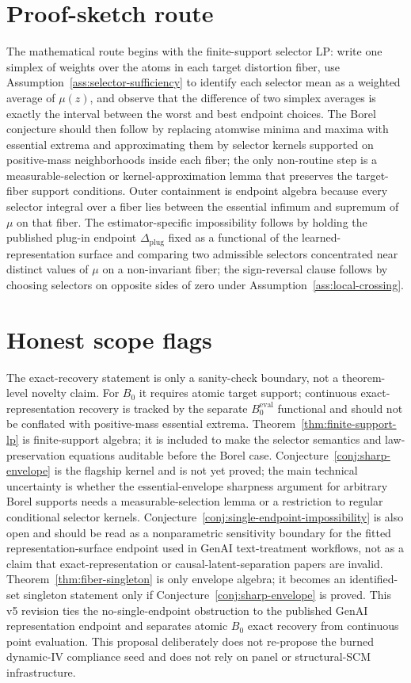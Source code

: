\documentclass[11pt]{article}
\theoremstyle{definition}
\theoremstyle{plain}
\theoremstyle{remark}
\begin{document}
\section{Proof-sketch route}
The mathematical route begins with the finite-support selector LP: write one simplex of weights over the atoms in each target distortion fiber, use Assumption~\ref{ass:selector-sufficiency} to identify each selector mean as a weighted average of \(\mu(z)\), and observe that the difference of two simplex averages is exactly the interval between the worst and best endpoint choices.  The Borel conjecture should then follow by replacing atomwise minima and maxima with essential extrema and approximating them by selector kernels supported on positive-mass neighborhoods inside each fiber; the only non-routine step is a measurable-selection or kernel-approximation lemma that preserves the target-fiber support conditions.  Outer containment is endpoint algebra because every selector integral over a fiber lies between the essential infimum and supremum of \(\mu\) on that fiber.  The estimator-specific impossibility follows by holding the published plug-in endpoint \(\Delta_{\mathrm{plug}}\) fixed as a functional of the learned-representation surface and comparing two admissible selectors concentrated near distinct values of \(\mu\) on a non-invariant fiber; the sign-reversal clause follows by choosing selectors on opposite sides of zero under Assumption~\ref{ass:local-crossing}.

\section{Honest scope flags}
The exact-recovery statement is only a sanity-check boundary, not a theorem-level novelty claim.  For \(B_0\) it requires atomic target support; continuous exact-representation recovery is tracked by the separate \(B^{\mathrm{eval}}_0\) functional and should not be conflated with positive-mass essential extrema.  Theorem~\ref{thm:finite-support-lp} is finite-support algebra; it is included to make the selector semantics and law-preservation equations auditable before the Borel case.  Conjecture~\ref{conj:sharp-envelope} is the flagship kernel and is not yet proved; the main technical uncertainty is whether the essential-envelope sharpness argument for arbitrary Borel supports needs a measurable-selection lemma or a restriction to regular conditional selector kernels.  Conjecture~\ref{conj:single-endpoint-impossibility} is also open and should be read as a nonparametric sensitivity boundary for the fitted representation-surface endpoint used in GenAI text-treatment workflows, not as a claim that exact-representation or causal-latent-separation papers are invalid.  Theorem~\ref{thm:fiber-singleton} is only envelope algebra; it becomes an identified-set singleton statement only if Conjecture~\ref{conj:sharp-envelope} is proved.  This v5 revision ties the no-single-endpoint obstruction to the published GenAI representation endpoint and separates atomic \(B_0\) exact recovery from continuous point evaluation.  This proposal deliberately does not re-propose the burned dynamic-IV compliance seed and does not rely on panel or structural-SCM infrastructure.
\end{document}
